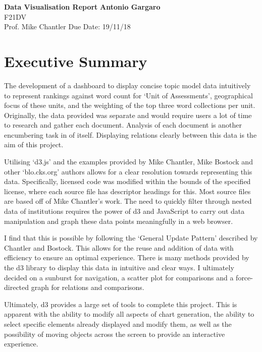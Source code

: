 \documentclass[a4paper, 11pt]{article}
\begin{document}
\noindent
\large\textbf{Data Visualisation Report} \hfill \textbf{Antonio Gargaro} \\
\normalsize F21DV \\
Prof. Mike Chantler  \hfill Due Date: 19/11/18  \\

\tableofcontents
\newpage

\section{Executive Summary}
The development of a dashboard to display concise topic model data intuitively to represent rankings against word count for `Unit of Assessments', geographical focus of these units, and the weighting of the top three word collections per unit. Originally, the data provided was separate and would require users a lot of time to research and gather each document. Analysis of each document is another encumbering task in of itself. Displaying relations clearly between this data is the aim of this project.

Utilising `d3.js' and the examples provided by Mike Chantler, Mike Bostock and other `blo.cks.org' authors allows for a clear resolution towards representing this data. Specifically, licensed code was modified within the bounds of the specified license, where each source file has descriptor headings for this. Most source files are based off of Mike Chantler's work. The need to quickly filter through nested data of institutions requires the power of d3 and JavaScript to carry out data manipulation and graph these data points meaningfully in a web browser.

I find that this is possible by following the `General Update Pattern' described by Chantler and Bostock. This allows for the reuse and addition of data with efficiency to ensure an optimal experience. There is many methods provided by the d3 library to display this data in intuitive and clear ways. I ultimately decided on a sunburst for navigation, a scatter plot for comparisons and a force-directed graph for relations and comparisons.

Ultimately, d3 provides a large set of tools to complete this project. This is apparent with the ability to modify all aspects of chart generation, the ability to select specific elements already displayed and modify them, as well as the possibility of moving objects across the screen to provide an interactive experience.
\end{document}
